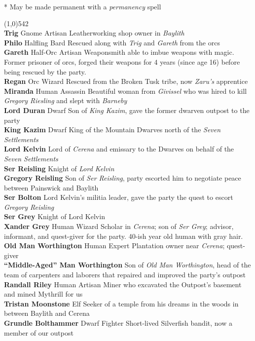 \documentclass[letterpaper]{article}
\newcommand{\fullline}{\noindent\line(1,0){542} \\}
\newcommand{\person}[3]{\noindent\textbf{#1
    \ifstrequal{#2}{M}{{\color{ProcessBlue}\male}}{%
    \ifstrequal{#2}{F}{\color{VioletRed}\female}{}}}{\scriptsize #3}}
\begin{document}
\noindent** May be made permanent with a \emph{permanency} spell

\pagebreak

 \par
\vspace{-0.75em}
\fullline
\person{Trig}{F}{Gnome Artisan} Leatherworking shop owner in \emph{Baylith} \\
\person{Philo}{M}{Halfling Bard} Rescued along with \emph{Trig} and \emph{Gareth} from the orcs \\
\person{Gareth}{M}{Half-Orc Artisan} Weaponsmith able to imbue weapons with magic. Former prisoner of orcs, forged their weapons for 4 years (since age 16) before being rescued by the party. \\
\person{Regan}{M}{Orc Wizard} Rescued from the Broken Tusk tribe, now \emph{Zaru's} apprentice \\
\person{Miranda}{F}{Human Assassin} Beautiful woman from \emph{Givissel} who was hired to kill \emph{Gregory Riesling} and slept with \emph{Barneby} \\
\person{Lord Duran}{M}{Dwarf} Son of \emph{King Kazim}, gave the former dwarven outpost to the party \\
\person{King Kazim}{M}{Dwarf} King of the Mountain Dwarves north of the \emph{Seven Settlements} \\
\person{Lord Kelvin}{M}{} Lord of \emph{Cerena} and emissary to the Dwarves on behalf of the \emph{Seven Settlements} \\
\person{Ser Reisling}{M}{} Knight of \emph{Lord Kelvin} \\
\person{Gregory Reisling}{M}{} Son of \emph{Ser Reisling}, party escorted him to negotiate peace between Painswick and Baylith \\
\person{Ser Bolton}{M}{} Lord Kelvin's militia leader, gave the party the quest to escort \emph{Gregory Reisling} \\
\person{Ser Grey}{M}{} Knight of Lord Kelvin \\
\person{Xander Grey}{M}{Human Wizard} Scholar in \emph{Cerena}; son of \emph{Ser Grey}; advisor, informant, and quest-giver for the party.  40-ish year old human with gray hair.\\
\person{Old Man Worthington}{M}{Human Expert} Plantation owner near \emph{Cerena}; quest-giver \\
\person{``Middle-Aged'' Man Worthington}{M}{} Son of \emph{Old Man Worthington}, head of the team of carpenters and laborers that repaired and improved the party's outpost \\
\person{Randall Riley}{M}{Human Artisan} Miner who excavated the Outpost's basement and mined Mythrill for us \\
\person{Tristan Moonstone}{M}{Elf} Seeker of a temple from his dreams in the woods in between Baylith and Cerena \\
\person{Grundle Bolthammer}{F}{Dwarf Fighter} Short-lived Silverfish bandit, now a member of our outpost\\
\end{document}
